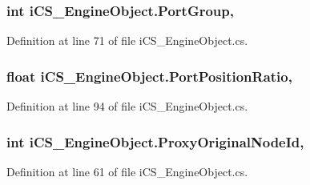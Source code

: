 \hypertarget{classi_c_s___engine_object_a02df407bee98eb455f6f129d463afcca}{
\subsubsection[{Port\+Group}]{\setlength{\rightskip}{0pt plus 5cm}int i\+C\+S\+\_\+\+Engine\+Object.\+Port\+Group\hspace{0.3cm}{\ttfamily [get]}, {\ttfamily [set]}}}\label{classi_c_s___engine_object_a02df407bee98eb455f6f129d463afcca}


Definition at line 71 of file i\+C\+S\+\_\+\+Engine\+Object.\+cs.

\hypertarget{classi_c_s___engine_object_a1d0dd5e2bc5b7abfd452a1cfdd4cd976}{
\subsubsection[{Port\+Position\+Ratio}]{\setlength{\rightskip}{0pt plus 5cm}float i\+C\+S\+\_\+\+Engine\+Object.\+Port\+Position\+Ratio\hspace{0.3cm}{\ttfamily [get]}, {\ttfamily [set]}}}\label{classi_c_s___engine_object_a1d0dd5e2bc5b7abfd452a1cfdd4cd976}


Definition at line 94 of file i\+C\+S\+\_\+\+Engine\+Object.\+cs.

\hypertarget{classi_c_s___engine_object_ab00c906a6e6506ec14ae69d52f20cbf3}{
\subsubsection[{Proxy\+Original\+Node\+Id}]{\setlength{\rightskip}{0pt plus 5cm}int i\+C\+S\+\_\+\+Engine\+Object.\+Proxy\+Original\+Node\+Id\hspace{0.3cm}{\ttfamily [get]}, {\ttfamily [set]}}}\label{classi_c_s___engine_object_ab00c906a6e6506ec14ae69d52f20cbf3}


Definition at line 61 of file i\+C\+S\+\_\+\+Engine\+Object.\+cs.

